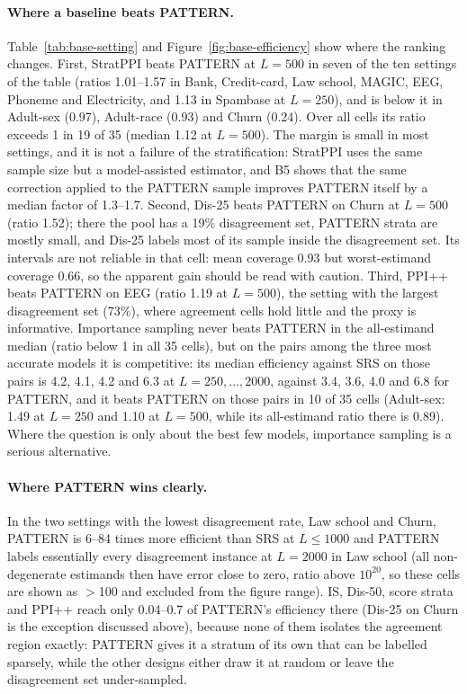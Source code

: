 \documentclass[pdflatex,sn-mathphys-num,iicol]{sn-jnl}
\theoremstyle{thmstyleone}
\theoremstyle{thmstyletwo}
\theoremstyle{thmstylethree}
\begin{document}
\paragraph{Where a baseline beats PATTERN.} Table~\ref{tab:base-setting} and Figure~\ref{fig:base-efficiency} show where the ranking changes. First, StratPPI beats PATTERN at $L=500$ in seven of the ten settings of the table (ratios 1.01--1.57 in Bank, Credit-card, Law school, MAGIC, EEG, Phoneme and Electricity, and 1.13 in Spambase at $L=250$), and is below it in Adult-sex (0.97), Adult-race (0.93) and Churn (0.24). Over all cells its ratio exceeds 1 in 19 of 35 (median 1.12 at $L=500$). The margin is small in most settings, and it is not a failure of the stratification: StratPPI uses the same sample size but a model-assisted estimator, and B5 shows that the same correction applied to the PATTERN sample improves PATTERN itself by a median factor of 1.3--1.7. Second, Dis-25 beats PATTERN on Churn at $L=500$ (ratio 1.52); there the pool has a 19\% disagreement set, PATTERN strata are mostly small, and Dis-25 labels most of its sample inside the disagreement set. Its intervals are not reliable in that cell: mean coverage 0.93 but worst-estimand coverage 0.66, so the apparent gain should be read with caution. Third, PPI++ beats PATTERN on EEG (ratio 1.19 at $L=500$), the setting with the largest disagreement set (73\%), where agreement cells hold little and the proxy is informative. Importance sampling never beats PATTERN in the all-estimand median (ratio below 1 in all 35 cells), but on the pairs among the three most accurate models it is competitive: its median efficiency against SRS on those pairs is 4.2, 4.1, 4.2 and 6.3 at $L=250,\dots,2000$, against 3.4, 3.6, 4.0 and 6.8 for PATTERN, and it beats PATTERN on those pairs in 10 of 35 cells (Adult-sex: 1.49 at $L=250$ and 1.10 at $L=500$, while its all-estimand ratio there is 0.89). Where the question is only about the best few models, importance sampling is a serious alternative.

\paragraph{Where PATTERN wins clearly.} In the two settings with the lowest disagreement rate, Law school and Churn, PATTERN is 6--84 times more efficient than SRS at $L\le1000$ and PATTERN labels essentially every disagreement instance at $L=2000$ in Law school (all non-degenerate estimands then have error close to zero, ratio above $10^{20}$, so these cells are shown as $>$100 and excluded from the figure range). IS, Dis-50, score strata and PPI++ reach only 0.04--0.7 of PATTERN's efficiency there (Dis-25 on Churn is the exception discussed above), because none of them isolates the agreement region exactly: PATTERN gives it a stratum of its own that can be labelled sparsely, while the other designs either draw it at random or leave the disagreement set under-sampled.
\end{document}
